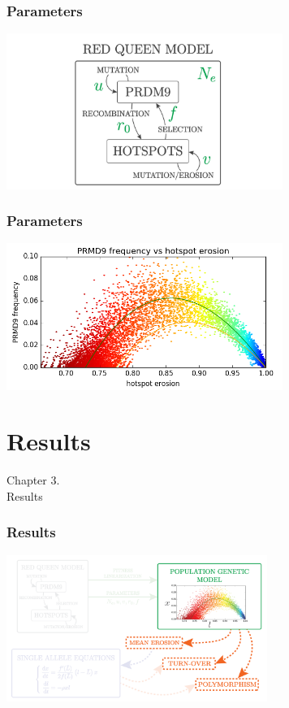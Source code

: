 \documentclass[10pt]{beamer}
\begin{document}
\begin{frame}
	\frametitle{Parameters}
	\begin{center}
       \includegraphics[width=9cm]{Images/red-queen-model.jpg}
	\end{center}
\end{frame}


\begin{frame}
	\frametitle{Parameters}
	\begin{center}
       \includegraphics[width=9cm]{Images/results.png}
	\end{center}
\end{frame}

\section{Results}

\begin{frame}
	\begin{center}
	\huge
	Chapter 3. \\
       Results
	\end{center}
\end{frame}


\begin{frame}
\frametitle{Results}
	\begin{center}
       \includegraphics[width=8.5cm]{Images/overline-3.png}
	\end{center}
\end{frame}
\end{document}
